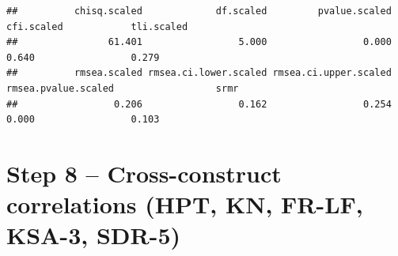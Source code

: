\documentclass[
  10pt,
]{article}
\begin{document}
\begin{verbatim}
##          chisq.scaled             df.scaled         pvalue.scaled            cfi.scaled            tli.scaled
##                61.401                 5.000                 0.000                 0.640                 0.279
##          rmsea.scaled rmsea.ci.lower.scaled rmsea.ci.upper.scaled   rmsea.pvalue.scaled                  srmr
##                 0.206                 0.162                 0.254                 0.000                 0.103
\end{verbatim}

\hypertarget{step-8-cross-construct-correlations-hpt-kn-fr-lf-ksa-3-sdr-5}{%
\section{Step 8 -- Cross-construct correlations (HPT, KN, FR-LF, KSA-3,
SDR-5)}\label{step-8-cross-construct-correlations-hpt-kn-fr-lf-ksa-3-sdr-5}}
\end{document}
